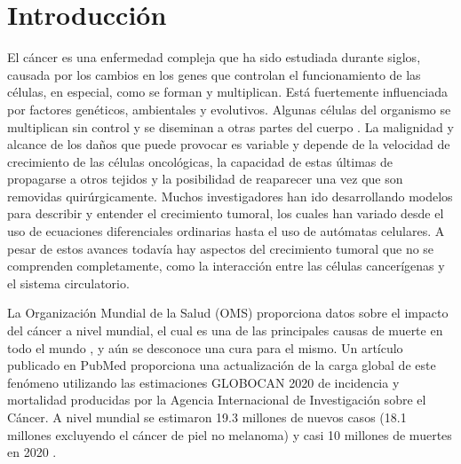 \chapter*{Introducción}\label{chapter:introduction}

\hspace{.1cm}El cáncer es una enfermedad compleja que ha sido estudiada durante siglos, causada por los cambios en los genes que controlan el funcionamiento de las células, en especial, como se forman y multiplican. Está fuertemente influenciada por factores genéticos, ambientales y evolutivos. Algunas células del organismo se multiplican sin control y se diseminan a otras partes del cuerpo \cite{nci2024}. La malignidad y alcance de los daños que puede provocar es variable y depende de la velocidad de crecimiento de las células oncológicas, la capacidad de estas últimas de propagarse a otros tejidos y la posibilidad de reaparecer una vez que son removidas quirúrgicamente. Muchos investigadores han ido desarrollando modelos para describir y entender el crecimiento tumoral, los cuales han variado desde el uso de ecuaciones diferenciales ordinarias hasta el uso de autómatas celulares. A pesar de estos avances todavía hay aspectos del crecimiento tumoral que no se comprenden completamente, como la interacción entre las células cancerígenas y el sistema circulatorio.

\hspace{.1cm}La Organización Mundial de la Salud (OMS) proporciona datos sobre el impacto del cáncer a nivel mundial, el cual es una de las principales causas de muerte en todo el mundo \cite{who2024}, y aún se desconoce una cura para el mismo. Un artículo publicado en PubMed \cite{soerjomataram2020} proporciona una actualización de la carga global de este fen\'omeno utilizando las estimaciones GLOBOCAN 2020 de incidencia y mortalidad producidas por la Agencia Internacional de Investigación sobre el Cáncer. A nivel mundial se estimaron 19.3 millones de nuevos casos (18.1 millones excluyendo el cáncer de piel no melanoma) y casi 10 millones de muertes en 2020 \cite{soerjomataram2020}.

